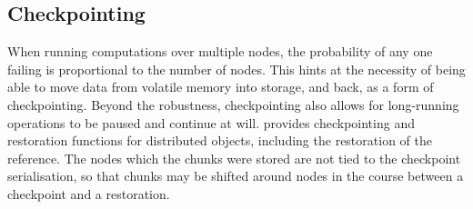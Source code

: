 \subsection{Checkpointing}

When running computations over multiple nodes, the probability of any one failing is proportional to the number of nodes.
This hints at the necessity of being able to move data from volatile memory into storage, and back, as a form of checkpointing.
Beyond the robustness, checkpointing also allows for long-running operations to be paused and continue at will.
\lsr{} provides checkpointing and restoration functions for distributed objects, including the restoration of the reference.
The nodes which the chunks were stored are not tied to the checkpoint serialisation, so that chunks may be shifted around nodes in the course between a checkpoint and a restoration.
